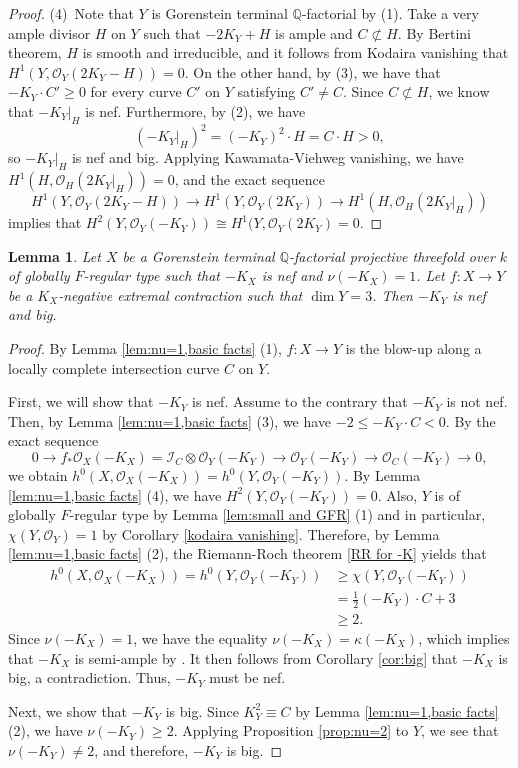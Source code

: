 \documentclass[12pt]{amsart}
\def\ge{\geqslant}
\def\le{\leqslant}
\newcommand{\Q}{\mathbb{Q}}
\newcommand{\sO}{\mathcal{O}}
\theoremstyle{plain}
\newtheorem{lem}[thm]{Lemma}
\theoremstyle{definition}
\theoremstyle{remark}
\newtheorem{defn and notation}[thm]{Definition and Notation}
\theoremstyle{plain}
\begin{document}
\begin{proof}
(4)\,
Note that $Y$ is Gorenstein terminal $\Q$-factorial by (1). 
Take a very ample divisor $H$ on $Y$ such that $-2K_Y+H$ is ample and $C\not\subset H$.
By Bertini theorem, $H$ is smooth and irreducible, and  it follows from Kodaira vanishing that $H^1(Y,\sO_Y(2K_Y-H))=0$.
On the other hand, by (3), we have that $-K_Y\cdot C'\ge 0$ for every curve $C'$ on $Y$ satisfying $C'\neq C$.
Since $C\not\subset H$, we know that $-K_Y|_H$ is nef.
Furthermore, by (2), we have 
\[
(-K_Y|_H)^2=(-K_Y)^2\cdot H=C\cdot H>0, 
\]
so $-K_Y|_H$ is nef and big. 
Applying Kawamata-Viehweg vanishing, we have $H^1(H, \sO_H(2K_Y|_H))=0$, and the exact sequence
\[
H^1(Y,\sO_Y(2K_Y-H)) \to H^1(Y, \sO_Y(2K_Y))\to H^1(H, \sO_H(2K_Y|_H))
\]
implies that $H^2(Y,\sO_Y(-K_Y))\cong H^1(Y, \sO_Y(2K_Y)=0$.  
\end{proof}

\begin{lem}\label{lem:nu=1,birat(singular)}
    Let $X$ be a Gorenstein terminal $\Q$-factorial projective threefold over $k$  of globally $F$-regular type such that $-K_X$ is nef and $\nu(-K_X)=1$.
    Let $f\colon X\to Y$ be a $K_X$-negative extremal contraction such that $\dim Y=3$. Then $-K_Y$ is nef and big.
\end{lem}
\begin{proof}
By Lemma \ref{lem:nu=1,basic facts} (1), $f\colon X\to Y$ is the blow-up along a locally complete intersection curve $C$ on $Y$. 

First, we will show that $-K_Y$ is nef. 
Assume to the contrary that  $-K_Y$ is not nef.
Then, by Lemma \ref{lem:nu=1,basic facts} (3), we have $-2 \le -K_Y\cdot C<0$. 
By the exact sequence
    \[
    0\to f_{*}\sO_X(-K_X)=\mathcal{I}_C\otimes \sO_Y(-K_Y) \to \sO_Y(-K_Y)\to \sO_C(-K_Y)\to 0,
    \]
we obtain $h^0(X,\sO_X(-K_X))=h^0(Y, \sO_Y(-K_Y))$.
By Lemma \ref{lem:nu=1,basic facts} (4), we have $H^2(Y,\sO_Y(-K_Y))=0$. 
Also, $Y$ is of globally $F$-regular type by Lemma \ref{lem:small and GFR} (1)
and in particular, $\chi(Y, \sO_Y)=1$ by Corollary \ref{kodaira vanishing}.
Therefore, by Lemma \ref{lem:nu=1,basic facts} (2), the Riemann-Roch theorem \eqref{RR for -K} yields that
\begin{align*}
    h^0(X,\sO_X(-K_X))=h^0(Y, \sO_Y(-K_Y)) &\ge \chi(Y, \sO_Y(-K_Y))\\
    &=\frac{1}{2}(-K_Y) \cdot C+3\\
    & \ge 2. 
\end{align*}
    Since $\nu(-K_X)=1$, we have the equality $\nu(-K_X)=\kappa(-K_X)$, which implies that $-K_X$ is semi-ample by \cite[Theorem 6.1]{Kawamata(gooddivisors)}.
    It then follows from Corollary \ref{cor:big} that $-K_X$ is big, a contradiction.  Thus, $-K_Y$ must be nef. 

Next, we  show that $-K_Y$ is big. 
Since $K_Y^2\equiv C$ by Lemma \ref{lem:nu=1,basic facts} (2), we have $\nu(-K_Y)\geq 2$.
Applying Proposition \ref{prop:nu=2} to $Y$, we see that $\nu(-K_Y)\neq 2$, and therefore, $-K_Y$ is big.
\end{proof}
\end{document}
